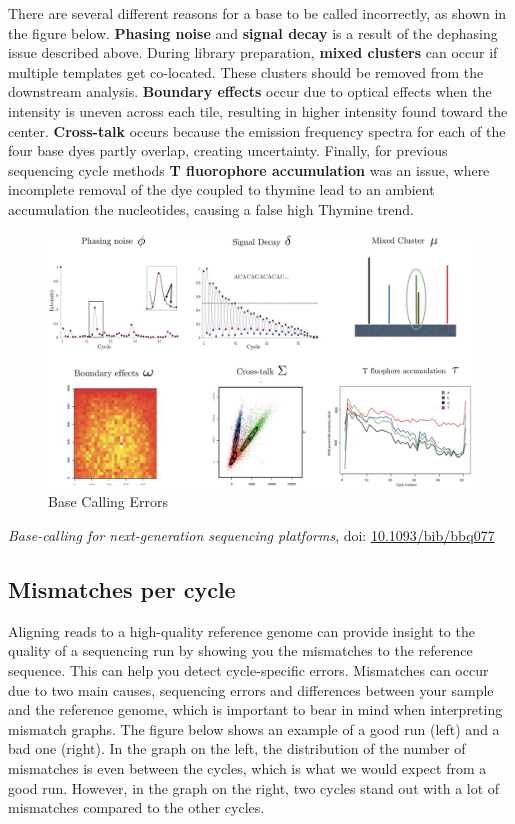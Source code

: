\documentclass[11pt]{article}
\begin{document}
There are several different reasons for a base to be called incorrectly,
as shown in the figure below. \textbf{Phasing noise} and \textbf{signal
decay} is a result of the dephasing issue described above. During
library preparation, \textbf{mixed clusters} can occur if multiple
templates get co-located. These clusters should be removed from the
downstream analysis. \textbf{Boundary effects} occur due to optical
effects when the intensity is uneven across each tile, resulting in
higher intensity found toward the center. \textbf{Cross-talk} occurs
because the emission frequency spectra for each of the four base dyes
partly overlap, creating uncertainty. Finally, for previous sequencing
cycle methods \textbf{T fluorophore accumulation} was an issue, where
incomplete removal of the dye coupled to thymine lead to an ambient
accumulation the nucleotides, causing a false high Thymine trend.

\pagebreak 

    \begin{figure}[!h]
\centering
\includegraphics{img/base_calling_errors.jpg}
\caption{Base Calling Errors}
\end{figure}

    \textit{Base-calling for next-generation sequencing platforms}, doi:
\href{https://academic.oup.com/bib/article/12/5/489/268399}{10.1093/bib/bbq077}

\hypertarget{mismatches-per-cycle}{%
\subsection{Mismatches per cycle}\label{mismatches-per-cycle}}

Aligning reads to a high-quality reference genome can provide insight to
the quality of a sequencing run by showing you the mismatches to the
reference sequence. This can help you detect cycle-specific errors.
Mismatches can occur due to two main causes, sequencing errors and
differences between your sample and the reference genome, which is
important to bear in mind when interpreting mismatch graphs. The figure
below shows an example of a good run (left) and a bad one (right). In
the graph on the left, the distribution of the number of mismatches is
even between the cycles, which is what we would expect from a good run.
However, in the graph on the right, two cycles stand out with a lot of
mismatches compared to the other cycles.
\end{document}
